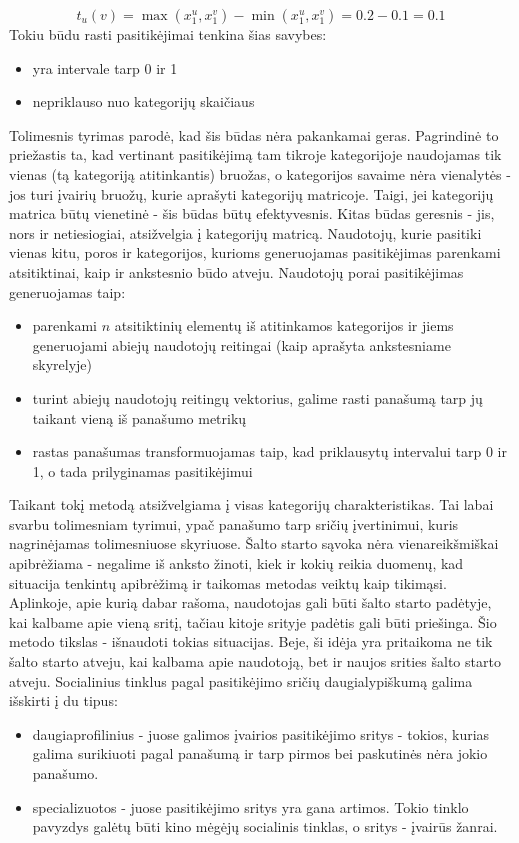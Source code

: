 \documentclass{VUMIFInfMagistrinis}
\begin{document}
\begin{equation}
t_u(v) = \max(x_1^u, x_1^v) - \min(x_1^u, x_1^v) = 0.2 -0.1 = 0.1
\end{equation}
Tokiu būdu rasti pasitikėjimai tenkina šias savybes:
\begin{itemize}
	\item yra intervale tarp 0 ir 1
	\item nepriklauso nuo kategorijų skaičiaus
\end{itemize}
\indent
Tolimesnis tyrimas parodė, kad šis būdas nėra pakankamai geras. Pagrindinė to priežastis ta, kad vertinant pasitikėjimą tam tikroje kategorijoje naudojamas tik vienas (tą kategoriją atitinkantis) bruožas, o kategorijos savaime nėra vienalytės - jos turi įvairių bruožų, kurie aprašyti kategorijų matricoje. Taigi, jei kategorijų matrica būtų vienetinė - šis būdas būtų efektyvesnis.
\newline
\indent
Kitas būdas geresnis - jis, nors ir netiesiogiai, atsižvelgia į kategorijų matricą. Naudotojų, kurie pasitiki vienas kitu, poros ir kategorijos, kurioms generuojamas pasitikėjimas parenkami atsitiktinai, kaip ir ankstesnio būdo atveju. Naudotojų porai pasitikėjimas generuojamas taip: 
\begin{itemize}
	\item parenkami $n$ atsitiktinių elementų iš atitinkamos kategorijos ir jiems generuojami abiejų naudotojų reitingai (kaip aprašyta ankstesniame skyrelyje)
	\item turint abiejų naudotojų reitingų vektorius, galime rasti panašumą tarp jų taikant vieną iš panašumo metrikų
	\item rastas panašumas transformuojamas taip, kad priklausytų intervalui tarp 0 ir 1, o tada prilyginamas pasitikėjimui
\end{itemize}
Taikant tokį metodą atsižvelgiama į visas kategorijų charakteristikas. Tai labai svarbu tolimesniam tyrimui, ypač panašumo tarp sričių įvertinimui, kuris nagrinėjamas tolimesniuose skyriuose.
\indent
Šalto starto sąvoka nėra vienareikšmiškai apibrėžiama - negalime iš anksto žinoti, kiek ir kokių reikia duomenų, kad situacija tenkintų apibrėžimą ir taikomas metodas veiktų kaip tikimąsi. Aplinkoje, apie kurią dabar rašoma, naudotojas gali būti šalto starto padėtyje, kai kalbame apie vieną sritį, tačiau kitoje srityje padėtis gali būti priešinga. Šio metodo tikslas - išnaudoti tokias situacijas. Beje, ši idėja yra pritaikoma ne tik šalto starto atveju, kai kalbama apie naudotoją, bet ir naujos srities šalto starto atveju. Socialinius tinklus pagal pasitikėjimo sričių daugialypiškumą galima išskirti į du tipus:
\begin{itemize}
	\item daugiaprofilinius - juose galimos įvairios pasitikėjimo sritys - tokios, kurias galima surikiuoti pagal panašumą ir tarp pirmos bei paskutinės nėra jokio panašumo.
	\item specializuotos - juose pasitikėjimo sritys yra gana artimos. Tokio tinklo pavyzdys galėtų būti kino mėgėjų socialinis tinklas, o sritys - įvairūs žanrai.
\end{itemize}
\end{document}

